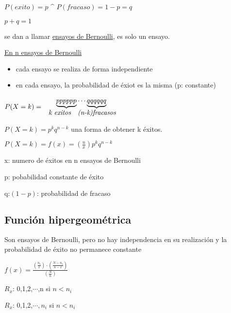 \documentclass[12pt]{report}
\begin{document}
\begin{large}
\begin{center}
$\displaystyle P(exito)=p$  \textbf{  \^  }  $ P(fracaso)=1-p=q$
\linebreak

$\displaystyle p+q=1$

se dan a llamar \underline{ensayos de Bernoulli}, es solo un ensayo.
\linebreak

\underline{En n ensayos de Bernoulli}
\begin{itemize}
	\item
		cada ensayo se realiza de forma independiente
	\item
		en cada ensayo, la probabilidad de éxiot es la misma (p: constante)
\end{itemize}

$\displaystyle P(X=k) =
\begin{array}{c}
 \underbrace{pppppp}\cdots \underbrace{qqqqqq}\\
 \textit{\hspace{0.1cm}k exitos \hspace{0.1cm} (n-k)fracasos}
 \end{array}$
\linebreak

$\displaystyle P(X=k) = p^k q^{n-k}$ una forma de obtener k éxitos.

$\displaystyle P(X=k) = f(x)= \left(
\frac{n}{x}
\right)  p^k q^{n-k}$

x: numero de éxitos en n ensayos de Bernoulli

p: pobabilidad constante de éxito

q:$(1-p)$: probabilidad de fracaso
\linebreak

\subsection*{Función hipergeométrica}
Son ensayos de Bernoulli, pero no hay independencia en su realización y la probabilidad de éxito no permanece constante
\linebreak

$\displaystyle f(x)=\frac{\left(
\frac{n_i}{x}
\right)\cdot \left(
\frac{N-n_i}{n-x}
\right)}{\left(
\frac{N}{n}
\right)}$

$R_x$: 0,1,2,$\cdots$,n
\hspace{1cm} si $n<n_i$

$R_x$: 0,1,2,$\cdots,n_i$
\hspace{1cm} si $n<n_i$
\linebreak


\end{center}
\end{large}
\end{document}
